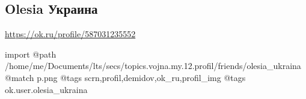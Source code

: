  
 
 
 
 

\subsection{Olesia Украина}

\url{https://ok.ru/profile/587031235552}

\ifcmt
 import
 @path /home/me/Documents/lts/secs/topics.vojna.my.12.profil/friends/olesia_ukraina
 @match p.png
 @tags scrn,profil,demidov,ok_ru,profil_img
 @tags ok.user.olesia_ukraina
\fi

